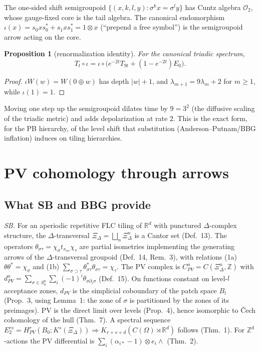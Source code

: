 \documentclass[11pt]{article}
\newtheorem{proposition}[theorem]{Proposition}
\theoremstyle{definition}
\theoremstyle{remark}
\newcommand{\Z}{\mathbb Z}
\newcommand{\R}{\mathbb R}
\newcommand{\dep}[1]{|#1|}
\begin{document}
The one-sided shift semigroupoid $\{(x,k,l,y):\sigma^kx=\sigma^ly\}$ has Cuntz algebra $\mathcal O_2$, whose gauge-fixed core is the tail algebra. The canonical endomorphism $\iota(x)=s_0xs_0^*+s_1xs_1^*=1\otimes x$ (``prepend a free symbol'') is the semigroupoid arrow acting on the core.

\begin{proposition}[renormalization identity]\label{prop:rg}
For the canonical triadic spectrum,
\[T_t\circ\iota=\iota\circ\big(e^{-2t}T_{9t}+(1-e^{-2t})E_0\big).\]
\end{proposition}

\begin{proof}
$\iota W(w)=W(0\oplus w)$ has depth $\dep w+1$, and $\lambda_{m+1}=9\lambda_m+2$ for $m\ge1$, while $\iota(1)=1$.
\end{proof}

Moving one step up the semigroupoid dilates time by $9=3^2$ (the diffusive scaling of the triadic metric) and adds depolarization at rate $2$. This is the exact form, for the PB hierarchy, of the level shift that substitution (Anderson--Putnam/BBG inflation) induces on tiling hierarchies.

\section{PV cohomology through arrows}\label{sec:pv}

\subsection{What SB and BBG provide}
\emph{SB.} For an aperiodic repetitive FLC tiling of $\R^d$ with punctured $\Delta$-complex structure, the $\Delta$-transversal $\Xi_\Delta=\bigsqcup_n\Xi^n_\Delta$ is a Cantor set (Def.~13). The operators $\theta_{\sigma\tau}=\chi_\sigma t_{x_{\sigma\tau}}\chi_\tau$ are partial isometries implementing the generating arrows of the $\Delta$-transversal groupoid (Def.~14, Rem.~3), with relations (1a) $\theta\theta^*=\chi_\sigma$ and (1b) $\sum_{\sigma\supset\tau}\theta^*_{\sigma\tau}\theta_{\sigma\tau}=\chi_\tau$. The PV complex is $C^n_{PV}=C(\Xi^n_\Delta,\Z)$ with $d^n_{PV}=\sum_{\sigma\in S^n_0}\sum_i(-1)^i\theta_{\sigma\partial_i\sigma}$ (Def.~15). On functions constant on level-$l$ acceptance zones, $d_{PV}$ is the simplicial coboundary of the patch space $B_l$ (Prop.~3, using Lemma~1: the zone of $\sigma$ is partitioned by the zones of its preimages). PV is the direct limit over levels (Prop.~4), hence isomorphic to \v{C}ech cohomology of the hull (Thm.~7). A spectral sequence $E_2^{rs}=H^r_{PV}(B_0;K^s(\Xi_\Delta))\Rightarrow K_{r+s+d}(C(\Omega)\rtimes\R^d)$ follows (Thm.~1). For $\Z^d$-actions the PV differential is $\sum_i(\alpha_{i*}-1)\otimes e_i\wedge$ (Thm.~2).
\end{document}
